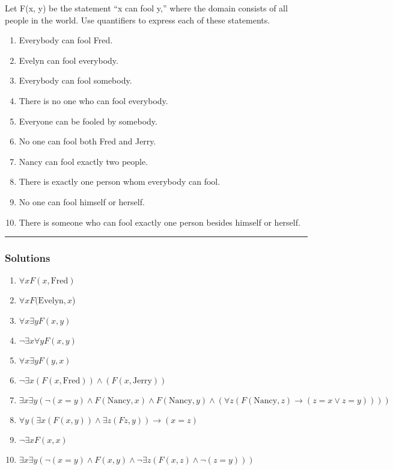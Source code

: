 \newpage
\begin{question}
Let F(x, y) be the statement “x can fool y,” where the domain consists of all people in the world. Use quantifiers to express each of these statements.
\begin{enumerate}
\item Everybody can fool Fred.
\item Evelyn can fool everybody.
\item Everybody can fool somebody.
\item There is no one who can fool everybody.
\item Everyone can be fooled by somebody.
\item No one can fool both Fred and Jerry.
\item Nancy can fool exactly two people.
\item There is exactly one person whom everybody can fool.
\item No one can fool himself or herself.
\item There is someone who can fool exactly one person besides himself or herself.
\end{enumerate}
\end{question}

\par\noindent\rule{\textwidth}{0.5pt}

\subsubsection*{Solutions}

\begin{enumerate}
    \item $\forall x F(x, \text{Fred})$
    \item $\forall x F(\text{Evelyn}, x$)
    \item $\forall x \exists y F(x, y)$
    \item $\neg \exists x \forall y F(x, y)$
    \item $\forall x \exists y F(y, x)$
    \item $\neg \exists x (F(x, \text{Fred})) \wedge (F(x, \text{Jerry}))$
    \item $\exists x \exists y (\neg(x = y) \wedge F(\text{Nancy}, x) \wedge F(\text{Nancy}, y) \wedge (\forall z (F(\text{Nancy}, z) \rightarrow (z = x \vee z = y))))$
    \item $\forall y (\exists x (F(x, y)) \wedge \exists z(F{z, y})) \rightarrow (x = z)$
    \item $ \neg \exists x F(x, x)$
    \item $\exists x \exists y (\neg(x = y) \wedge F(x, y) \wedge \neg \exists z (F(x, z) \wedge \neg(z = y)))$
\end{enumerate}
